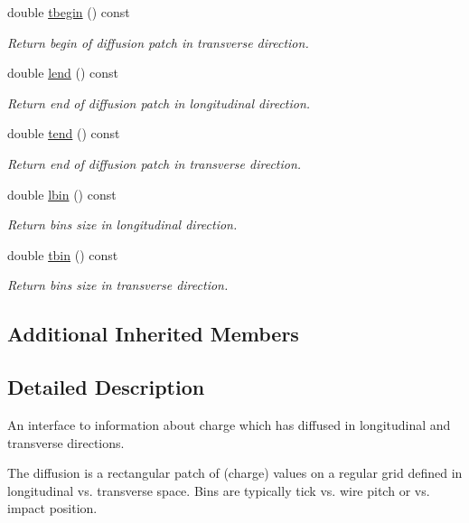 \begin{DoxyCompactItemize}
double \hyperlink{class_wire_cell_1_1_i_diffusion_ae1a5b7ca2e573661e358b604c9b3adfc}{tbegin} () const
\begin{DoxyCompactList}\small\item\em Return begin of diffusion patch in transverse direction. \end{DoxyCompactList}\item 
double \hyperlink{class_wire_cell_1_1_i_diffusion_a1016b2629bf19ceb69815200d5f1480f}{lend} () const
\begin{DoxyCompactList}\small\item\em Return end of diffusion patch in longitudinal direction. \end{DoxyCompactList}\item 
double \hyperlink{class_wire_cell_1_1_i_diffusion_ab14ac45f6a21301ba83eebd9d5eabff2}{tend} () const
\begin{DoxyCompactList}\small\item\em Return end of diffusion patch in transverse direction. \end{DoxyCompactList}\item 
double \hyperlink{class_wire_cell_1_1_i_diffusion_ac82a15088681538902392c880666aa3e}{lbin} () const
\begin{DoxyCompactList}\small\item\em Return bins size in longitudinal direction. \end{DoxyCompactList}\item 
double \hyperlink{class_wire_cell_1_1_i_diffusion_abf2ecc1831078625a9f0fd439d773ce8}{tbin} () const
\begin{DoxyCompactList}\small\item\em Return bins size in transverse direction. \end{DoxyCompactList}\end{DoxyCompactItemize}
\subsection*{Additional Inherited Members}


\subsection{Detailed Description}
An interface to information about charge which has diffused in longitudinal and transverse directions.

The diffusion is a rectangular patch of (charge) values on a regular grid defined in longitudinal vs. transverse space. Bins are typically tick vs. wire pitch or vs. impact position.

